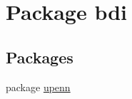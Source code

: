 \hypertarget{namespacebdi}{\section{Package bdi}
\label{namespacebdi}
}
\subsection*{Packages}
\begin{DoxyCompactItemize}
\item 
package \hyperlink{namespacebdi_1_1upenn}{upenn}
\end{DoxyCompactItemize}
